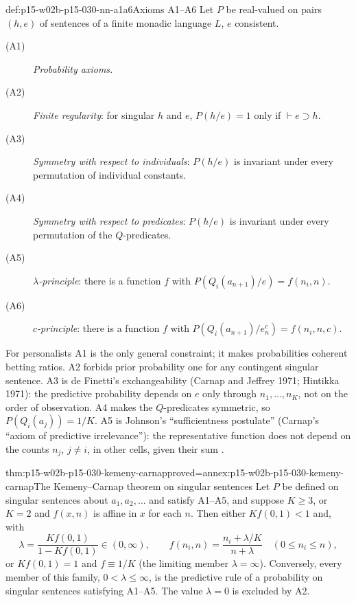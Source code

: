 \begin{hbdefinition}{def:p15-w02b-p15-030-nn-a1a6}{Axioms A1--A6}
Let \(P\) be real-valued on pairs \((h,e)\) of sentences of a finite
monadic language \(L\), \(e\) consistent.
\begin{description}
\item[(A1)] \emph{Probability axioms.}
\item[(A2)] \emph{Finite regularity}: for singular \(h\) and \(e\),
  \(P(h/e)=1\) only if \(\vdash e\supset h\).
\item[(A3)] \emph{Symmetry with respect to individuals}: \(P(h/e)\) is
  invariant under every permutation of individual constants.
\item[(A4)] \emph{Symmetry with respect to predicates}: \(P(h/e)\) is
  invariant under every permutation of the \(Q\)-predicates.
\item[(A5)] \emph{\(\lambda\)-principle}: there is a function \(f\) with
  \(P(Q_i(a_{n+1})/e)=f(n_i,n)\).
\item[(A6)] \emph{\(c\)-principle}: there is a function \(f\) with
  \(P(Q_i(a_{n+1})/e^c_n)=f(n_i,n,c)\).
\end{description}
\cite[pp.~322--324]{Niiniluoto2011HintikkaProgramReading}
\end{hbdefinition}

For personalists A1 is the only general constraint; it makes
probabilities coherent betting ratios. A2 forbids prior probability one
for any contingent singular sentence. A3 is de Finetti's exchangeability (Carnap and Jeffrey 1971; Hintikka
1971):
the predictive probability depends on \(e\) only through
\(n_1,\ldots,n_K\), not on the order of observation. A4 makes the
\(Q\)-predicates symmetric, so \(P(Q_i(a_j))=1/K\). A5 is Johnson's
``sufficientness postulate'' (Carnap's ``axiom of predictive
irrelevance''): the representative function does not depend on the
counts \(n_j\), \(j\neq i\), in other cells, given their sum
\cite[pp.~322--323]{Niiniluoto2011HintikkaProgramReading}.

\begin{hbtheorem}{thm:p15-w02b-p15-030-kemeny-carnap}{proved=annex:p15-w02b-p15-030-kemeny-carnap}{The Kemeny--Carnap theorem on singular sentences}
Let \(P\) be defined on singular sentences about \(a_1,a_2,\ldots\) and
satisfy A1--A5, and suppose \(K\geq3\), or \(K=2\) and \(f(x,n)\) is
affine in \(x\) for each \(n\). Then either \(Kf(0,1)<1\) and, with
\[
 \lambda=\frac{Kf(0,1)}{1-Kf(0,1)}\in(0,\infty),\qquad
 f(n_i,n)=\frac{n_i+\lambda/K}{n+\lambda}\quad(0\leq n_i\leq n),
\]
or \(Kf(0,1)=1\) and \(f\equiv1/K\) (the limiting member
\(\lambda=\infty\)). Conversely, every member of this family,
\(0<\lambda\leq\infty\), is the predictive rule of a probability on
singular sentences satisfying A1--A5. The value \(\lambda=0\) is excluded
by A2.
\end{hbtheorem}

